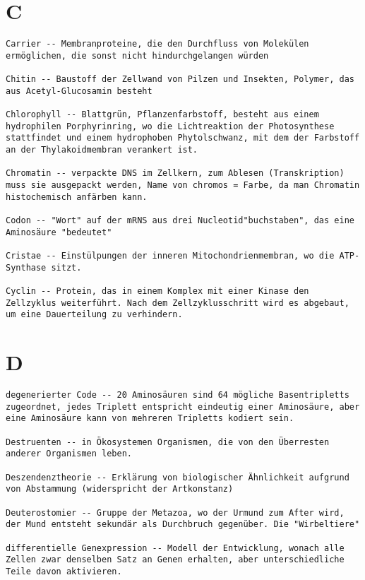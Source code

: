 \documentclass{article}
\begin{document}
\section{C}
\begin{verbatim}
Carrier -- Membranproteine, die den Durchfluss von Molekülen ermöglichen, die sonst nicht hindurchgelangen würden

Chitin -- Baustoff der Zellwand von Pilzen und Insekten, Polymer, das aus Acetyl-Glucosamin besteht

Chlorophyll -- Blattgrün, Pflanzenfarbstoff, besteht aus einem hydrophilen Porphyrinring, wo die Lichtreaktion der Photosynthese stattfindet und einem hydrophoben Phytolschwanz, mit dem der Farbstoff an der Thylakoidmembran verankert ist.

Chromatin -- verpackte DNS im Zellkern, zum Ablesen (Transkription) muss sie ausgepackt werden, Name von chromos = Farbe, da man Chromatin histochemisch anfärben kann.

Codon -- "Wort" auf der mRNS aus drei Nucleotid"buchstaben", das eine Aminosäure "bedeutet"

Cristae -- Einstülpungen der inneren Mitochondrienmembran, wo die ATP-Synthase sitzt.

Cyclin -- Protein, das in einem Komplex mit einer Kinase den Zellzyklus weiterführt. Nach dem Zellzyklusschritt wird es abgebaut, um eine Dauerteilung zu verhindern.
\end{verbatim}
\newpage


\section{D}
\begin{verbatim}
degenerierter Code -- 20 Aminosäuren sind 64 mögliche Basentripletts zugeordnet, jedes Triplett entspricht eindeutig einer Aminosäure, aber eine Aminosäure kann von mehreren Tripletts kodiert sein.

Destruenten -- in Ökosystemen Organismen, die von den Überresten anderer Organismen leben.

Deszendenztheorie -- Erklärung von biologischer Ähnlichkeit aufgrund von Abstammung (widerspricht der Artkonstanz)

Deuterostomier -- Gruppe der Metazoa, wo der Urmund zum After wird, der Mund entsteht sekundär als Durchbruch gegenüber. Die "Wirbeltiere"

differentielle Genexpression -- Modell der Entwicklung, wonach alle Zellen zwar denselben Satz an Genen erhalten, aber unterschiedliche Teile davon aktivieren.
\end{verbatim}
\newpage
\end{document}
